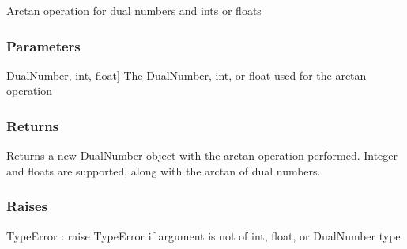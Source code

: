 \documentclass[letterpaper,10pt,english]{sphinxmanual}
\begin{document}
\begin{fulllineitems}
\label{\detokenize{autodiff:autodiff.operators.arctan}}
\pysigstartsignatures
{}
\pysigstopsignatures
\sphinxAtStartPar
Arctan operation for dual numbers and ints or floats


\subsubsection{Parameters}
\label{\detokenize{autodiff:id12}}\begin{description}
\sphinxlineitem{x}{[}DualNumber, int, float{]}
\sphinxAtStartPar
The DualNumber, int, or float used for the arctan operation

\end{description}


\subsubsection{Returns}
\label{\detokenize{autodiff:id13}}\begin{description}
\sphinxAtStartPar
Returns a new DualNumber object with the arctan operation performed. Integer and
floats are supported, along with the arctan of dual numbers.

\end{description}


\subsubsection{Raises}
\label{\detokenize{autodiff:id14}}
\sphinxAtStartPar
TypeError : raise TypeError if argument is not of int, float, or DualNumber type

\end{fulllineitems}

\end{document}
